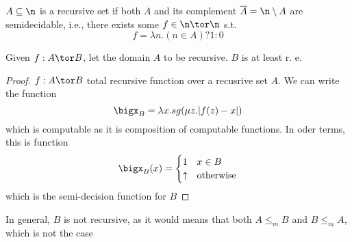 \begin{definition}
  \(A\subseteq \n\) is a recursive set if both \(A\) and its
  complement \(\overline{A} = \n \setminus A\) are semidecidable,
  i.e., there exists some \(f \in \n \tor \n\) s.t. \[f = \lambda n
  . (n \in A) ? 1 : 0\]
\end{definition}

\begin{theorem}
  Given \(f : A \tor B\), let the domain \(A\) to be recursive. \(B\)
  is at least r. e.
\end{theorem}

\begin{proof}
  \(f : A \tor B\) total recursive function over a recusrive set
  \(A\). We can write the function \[\bigx_B = \lambda x . sg(\mu z
  . |f(z) - x|)\] which is computable as it is composition of
  computable functions. In oder terms, this is function
  \[\bigx_B(x)
  = \begin{cases}
    1 & x \in B \\
    \uparrow & \text{otherwise}
  \end{cases}\]
  which is the semi-decision function for \(B\)
\end{proof}

\begin{observation}
  In general, \(B\) is not recursive, as it would means that both \(A
  \leq_m B\) and \(B \leq_m A\), which is not the case
\end{observation}
